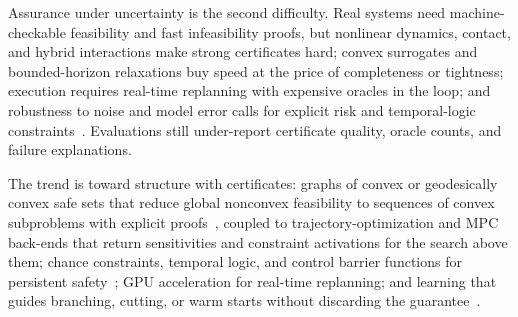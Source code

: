 Assurance under uncertainty is the second difficulty. Real systems need machine-checkable feasibility and fast infeasibility proofs, but nonlinear dynamics, contact, and hybrid interactions make strong certificates hard; convex surrogates and bounded-horizon relaxations buy speed at the price of completeness or tightness; execution requires real-time replanning with expensive oracles in the loop; and robustness to noise and model error calls for explicit risk and temporal-logic constraints~\cite{Blackmore2011ChanceConstraints,Raman2014STL,Ames2019CBF}. Evaluations still under-report certificate quality, oracle counts, and failure explanations.

The trend is toward structure with certificates: graphs of convex or geodesically convex safe sets that reduce global nonconvex feasibility to sequences of convex subproblems with explicit proofs~\cite{Marcucci2024GCSShortest,Dai2024CIRIS}, coupled to trajectory-optimization and MPC back-ends that return sensitivities and constraint activations for the search above them; chance constraints, temporal logic, and control barrier functions for persistent safety~\cite{Blackmore2011ChanceConstraints,Ames2019CBF}; GPU acceleration for real-time replanning; and learning that guides branching, cutting, or warm starts without discarding the guarantee~\cite{Ly2023RLGP,Vu2024COAST}.
